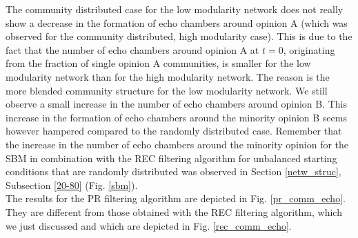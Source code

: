 \documentclass[11 pt , letterpaper , twoside , openright]{book}
\begin{document}
\newline
The community distributed case for the low modularity network does not really show a decrease in the formation of echo chambers around opinion A (which was observed for the community distributed, high modularity case). This is due to the fact that the number of echo chambers around opinion A at $t=0$, originating from the fraction of single opinion A communities, is smaller for the low modularity network than for the high modularity network. The reason is the more blended community structure for the low modularity network. We still observe a small increase in the number of echo chambers around opinion B. This increase in the formation of echo chambers around the minority opinion B seems however hampered compared to the randomly distributed case. Remember that the increase in the number of echo chambers around the minority opinion for the SBM in combination with the REC filtering algorithm for unbalanced starting conditions that are randomly distributed was observed in Section \ref{netw_struc}, Subsection \ref{20-80} (Fig. \ref{sbm}). \\
\newline    %
The results for the PR filtering algorithm are depicted in Fig. \ref{pr_comm_echo}. They are different from those obtained with the REC filtering algorithm, which we just discussed and which are depicted in Fig. \ref{rec_comm_echo}.\\
\newline
\end{document}
